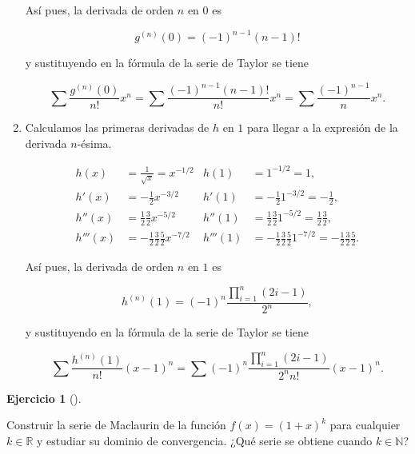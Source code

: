 \documentclass[
  a4paper,
]{scrreport}
\theoremstyle{definition}
\newtheorem{exercise}{Ejercicio}[chapter]
\theoremstyle{remark}
\begin{document}
\begin{tcolorbox}
\begin{enumerate}
  Así pues, la derivada de orden \(n\) en \(0\) es

  \[
   g^{(n)}(0) = (-1)^{n-1}(n-1)!
   \]

  y sustituyendo en la fórmula de la serie de Taylor se tiene

  \[
   \sum \frac{g^{(n)}(0)}{n!}x^n = \sum \frac{(-1)^{n-1}(n-1)!}{n!}x^n = \sum \frac{(-1)^{n-1}}{n}x^n.
   \]
\item
  Calculamos las primeras derivadas de \(h\) en \(1\) para llegar a la
  expresión de la derivada \(n\)-ésima.

  \begin{align*}
   h(x) &= \frac{1}{\sqrt{x}} = x^{-1/2} & h(1) &= 1^{-1/2} = 1,\\
   h'(x) &= -\frac{1}{2}x^{-3/2} & h'(1) &= -\frac{1}{2}1^{-3/2} = -\frac{1}{2},\\
   h''(x) &= \frac{1}{2}\frac{3}{2}x^{-5/2} & h''(1) &= \frac{1}{2}\frac{3}{2}1^{-5/2} = \frac{1}{2}\frac{3}{2},\\
   h'''(x) &= -\frac{1}{2}\frac{3}{2}\frac{5}{2}x^{-7/2} & h'''(1) &= -\frac{1}{2}\frac{3}{2}\frac{5}{2}1^{-7/2} = -\frac{1}{2}\frac{3}{2}\frac{5}{2}.
   \end{align*}

  Así pues, la derivada de orden \(n\) en \(1\) es

  \[
   h^{(n)}(1) = (-1)^n\frac{\prod_{i=1}^n(2i-1)}{2^n},
   \]

  y sustituyendo en la fórmula de la serie de Taylor se tiene

  \[
   \sum \frac{h^{(n)}(1)}{n!}(x-1)^n = \sum (-1)^n\frac{\prod_{i=1}^n(2i-1)}{2^nn!}(x-1)^n.
   \]
\end{enumerate}

\end{tcolorbox}

\leavevmode{}%
\begin{exercise}[]\label{exr-serie-binomial}

Construir la serie de Maclaurin de la función \(f(x)= (1+x)^k\) para
cualquier \(k\in\mathbb{R}\) y estudiar su dominio de convergencia. ¿Qué
serie se obtiene cuando \(k\in\mathbb{N}\)?

\end{exercise}
\end{document}
